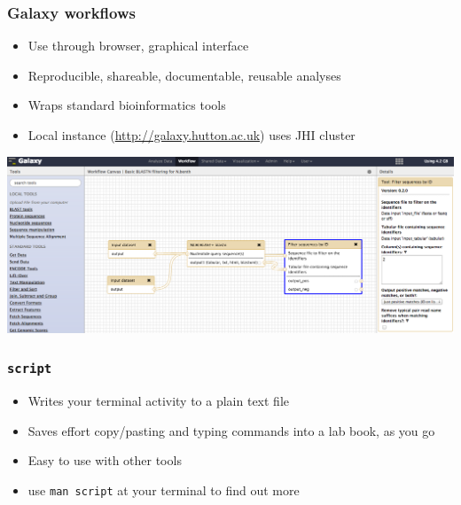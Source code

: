 \begin{frame}
  \frametitle{Galaxy workflows}
  \begin{itemize}
    \item Use through browser, graphical interface
    \item Reproducible, shareable, documentable, reusable analyses
    \item Wraps standard bioinformatics tools
    \item Local instance (\url{http://galaxy.hutton.ac.uk}) uses JHI cluster       
  \end{itemize}
  \begin{center}
    \includegraphics[width=.75\textwidth]{images/galaxy_screenshot}
  \end{center}
\end{frame}      
   
\begin{frame}
  \frametitle{\texttt{script}}
  \begin{itemize}
    \item Writes your terminal activity to a plain text file
    \item Saves effort copy/pasting and typing commands into a lab book, as you go
    \item Easy to use with other tools 
    \item use \texttt{man script} at your terminal to find out more
  \end{itemize}
\end{frame}   
   
